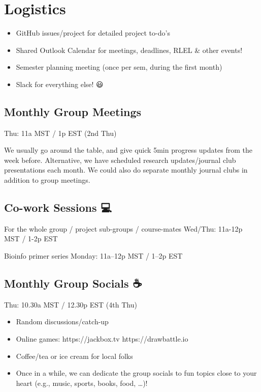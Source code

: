 \documentclass[
  letterpaper,
  DIV=11,
  numbers=noendperiod]{scrreprt}
\providecommand{\tightlist}{%
  \setlength{\itemsep}{0pt}\setlength{\parskip}{0pt}}\usepackage{longtable,booktabs,array}
\begin{document}
\hypertarget{logistics}{%
\section{Logistics}\label{logistics}}

\begin{itemize}
\tightlist
\item
  GitHub issues/project for detailed project to-do's
\item
  Shared Outlook Calendar for meetings, deadlines, RLEL \& other events!
\item
  Semester planning meeting (once per sem, during the first month)
\item
  Slack for everything else! 😃
\end{itemize}

\hypertarget{monthly-group-meetings}{%
\subsection{Monthly Group Meetings}\label{monthly-group-meetings}}

Thu: 11a MST / 1p EST (2nd Thu)

We usually go around the table, and give quick 5min progress updates
from the week before. Alternative, we have scheduled research
updates/journal club presentations each month. We could also do separate
monthly journal clubs in addition to group meetings.

\hypertarget{co-work-sessions}{%
\subsection{Co-work Sessions 💻}\label{co-work-sessions}}

For the whole group / project sub-groups / course-mates Wed/Thu: 11a-12p
MST / 1-2p EST

Bioinfo primer series Monday: 11a--12p MST / 1--2p EST

\hypertarget{monthly-group-socials}{%
\subsection{Monthly Group Socials ☕ 🍵
🥐}\label{monthly-group-socials}}

Thu: 10.30a MST / 12.30p EST (4th Thu)

\begin{itemize}
\tightlist
\item
  Random discussions/catch-up
\item
  Online games: https://jackbox.tv \textbar{} https://drawbattle.io
\item
  Coffee/tea or ice cream for local folks
\item
  Once in a while, we can dedicate the group socials to fun topics close
  to your heart (e.g., music, sports, books, food, \ldots)!
\end{itemize}
\end{document}
